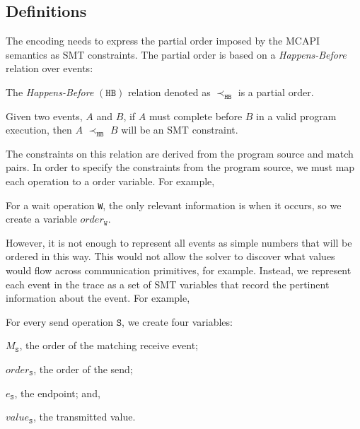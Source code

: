 \subsection{Definitions}

The encoding needs to express the partial order imposed by the MCAPI
semantics as SMT constraints. The partial order is based on a
\emph{Happens-Before} relation over events:

\begin{definition}
The \emph{Happens-Before} $(\mathtt{HB})$ relation denoted as
$\mathrm{\prec_\mathtt{HB}}$ is a partial order.
\label{def:hb}
\end{definition}

Given two events, $A$ and $B$, if $A$ must complete before $B$ in a
valid program execution, then $A$ $\mathrm{\prec_{\mathtt{HB}}}$ $B$
will be an SMT constraint.

The constraints on this relation are derived from the program source
and match pairs. In order to specify the constraints from the program
source, we must map each operation to a order variable. For example,

\begin{definition}[Wait] \label{def:event}
For a wait operation \texttt{W}, the only relevant information is when
it occurs, so we create a variable $\mathit{order}_\mathtt{W}$.
\end{definition}

However, it is not enough to represent all events as simple numbers
that will be ordered in this way. This would not allow the solver to
discover what values would flow across communication primitives, for
example. Instead, we represent each event in the trace as a set of SMT
variables that record the pertinent information about the event. For
example,

\begin{definition}[Send] \label{def:snd}
For every send operation $\mathtt{S}$, we create four variables:
\begin{compactenum}
\item $M_\mathtt{S}$, the order of the matching receive event;

\item $\mathit{order}_\mathtt{S}$, the order of the send;

\item $e_\mathtt{S}$, the endpoint; and,

\item $\mathit{value}_\mathtt{S}$, the transmitted value.
\end{compactenum}
\end{definition}

